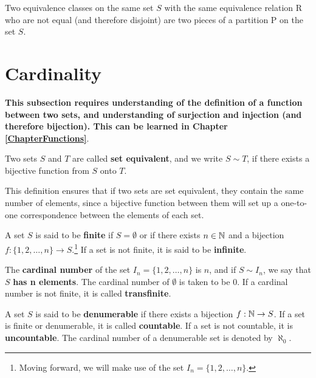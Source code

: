 \begin{eg}
	Two equivalence classes on the same set $S$ with the same equivalence relation R who are not equal (and therefore disjoint) are two pieces of a partition P on the set $S$.
\end{eg}

\newpage
\section{Cardinality}

\textbf{This subsection requires understanding of the definition of a function between two sets, and understanding of surjection and injection (and therefore bijection). This can be learned in Chapter \ref{ChapterFunctions}}.

\begin{definition}
	Two sets $S$ and $T$ are called \textbf{set equivalent}, and we write $S\sim T$, if there exists a bijective function from $S$ onto $T$.
\end{definition}

This definition ensures that if two sets are set equivalent, they contain the same number of elements, since a bijective function between them will set up a one-to-one correspondence between the elements of each set.

\begin{definition}
	A set $S$ is said to be \textbf{finite} if $S=\emptyset$ or if there exists $n\in \mathbb{N}$ and a bijection $f:\{1,2,\hdots,n\}\rightarrow S$.\footnote{Moving forward, we will make use of the set $I_n=\{1,2,\hdots,n\}$.} If a set is not finite, it is said to be \textbf{infinite}.
\end{definition}

\begin{definition}
	The \textbf{cardinal number} of the set $I_n=\{1,2,\hdots,n\}$ is $n$, and if $S\sim I_n$, we say that $S$ \textbf{has n elements}. The cardinal number of $\emptyset$ is taken to be $0$. If a cardinal number is not finite, it is called \textbf{transfinite}. 
\end{definition}

\begin{definition}
	A set $S$ is said to be \textbf{denumerable} if there exists a bijection $f:\mathbb{N} \rightarrow S$. If a set is finite or denumerable, it is called \textbf{countable}. If a set is not countable, it is \textbf{uncountable}. The cardinal number of a denumerable set is denoted by $\aleph_0$.
\end{definition}

